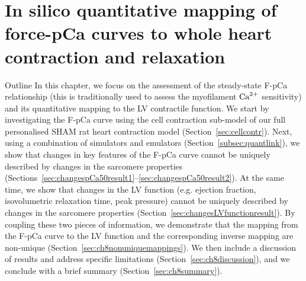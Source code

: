 \chapter{In silico quantitative mapping of force-pCa curves to whole heart contraction and relaxation}\label{cha:chapter8}
%
%
%
\begin{remark}{Outline}
    In this chapter, we focus on the assessment of the steady-state F-pCa relationship (this is traditionally used to assess the myofilament $\textrm{Ca}^{2+}$ sensitivity) and its quantitative mapping to the LV contractile function. We start by investigating the F-pCa curve using the cell contraction sub-model of our full personalised SHAM rat heart contraction model (Section~\ref{sec:cellcontr}). Next, using a combination of simulators and emulators (Section~\ref{subsec:quantlink}), we show that changes in key features of the F-pCa curve cannot be uniquely described by changes in the sarcomere properties (Sections~\ref{sec:changespCa50result1}--\ref{sec:changespCa50result2}). At the same time, we show that changes in the LV function (e.g. ejection fraction, isovolumetric relaxation time, peak pressure) cannot be uniquely described by changes in the sarcomere properties (Section~\ref{sec:changesLVfunctionresult}). By coupling these two pieces of information, we demonstrate that the mapping from the F-pCa curve to the LV function and the corresponding inverse mapping are non-unique (Section~\ref{sec:ch8nonuniquemappings}). We then include a discussion of results and address specific limitations (Section~\ref{sec:ch8discussion}), and we conclude with a brief summary (Section~\ref{sec:ch8summary}).
\end{remark}


%
%
%
